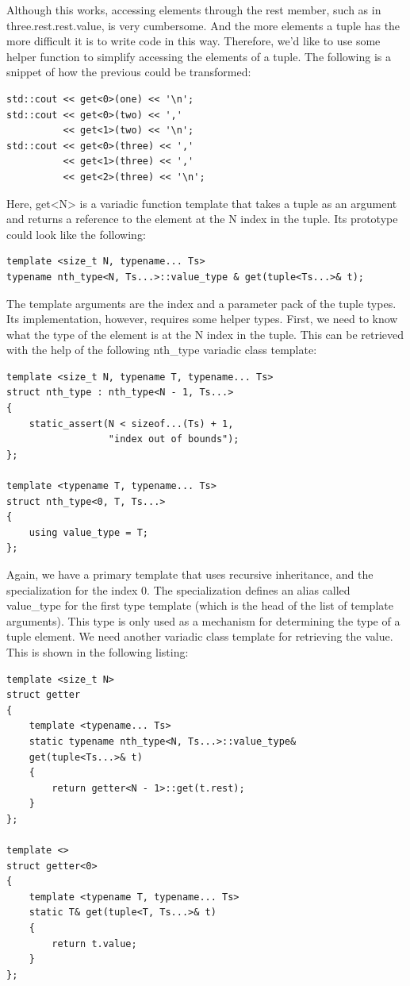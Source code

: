 Although this works, accessing elements through the rest member, such as in three.rest.rest.value, is very cumbersome. And the more elements a tuple has the more difficult it is to write code in this way. Therefore, we'd like to use some helper function to simplify accessing the elements of a tuple. The following is a snippet of how the previous could be transformed:

\begin{lstlisting}[style=styleCXX]
std::cout << get<0>(one) << '\n';
std::cout << get<0>(two) << ','
          << get<1>(two) << '\n';
std::cout << get<0>(three) << ','
          << get<1>(three) << ','
          << get<2>(three) << '\n';
\end{lstlisting}

Here, get<N> is a variadic function template that takes a tuple as an argument and returns a reference to the element at the N index in the tuple. Its prototype could look like the following:

\begin{lstlisting}[style=styleCXX]
template <size_t N, typename... Ts>
typename nth_type<N, Ts...>::value_type & get(tuple<Ts...>& t);
\end{lstlisting}

The template arguments are the index and a parameter pack of the tuple types. Its implementation, however, requires some helper types. First, we need to know what the type of the element is at the N index in the tuple. This can be retrieved with the help of the following nth\_type variadic class template:

\begin{lstlisting}[style=styleCXX]
template <size_t N, typename T, typename... Ts>
struct nth_type : nth_type<N - 1, Ts...>
{
	static_assert(N < sizeof...(Ts) + 1,
	              "index out of bounds");
};

template <typename T, typename... Ts>
struct nth_type<0, T, Ts...>
{
	using value_type = T;
};
\end{lstlisting}

Again, we have a primary template that uses recursive inheritance, and the specialization for the index 0. The specialization defines an alias called value\_type for the first type template (which is the head of the list of template arguments). This type is only used as a mechanism for determining the type of a tuple element. We need another variadic class template for retrieving the value. This is shown in the following listing:

\begin{lstlisting}[style=styleCXX]
template <size_t N>
struct getter
{
	template <typename... Ts>
	static typename nth_type<N, Ts...>::value_type&
	get(tuple<Ts...>& t)
	{
		return getter<N - 1>::get(t.rest);
	}
};

template <>
struct getter<0>
{
	template <typename T, typename... Ts>
	static T& get(tuple<T, Ts...>& t)
	{
		return t.value;
	}
};
\end{lstlisting}

